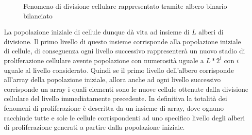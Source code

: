 \begin{figure}[H]
\centering
{}
\caption{Fenomeno di divisione cellulare rappresentato tramite albero
    binario bilanciato}
\label{fig:proliferation-tree}
\end{figure}

La popolazione iniziale di cellule dunque dà vita ad insieme di $L$ alberi di
divisione. Il primo livello di questo insieme corrisponde alla popolazione
iniziale di cellule, di conseguenza ogni livello successivo rappresenterà
un nuovo stadio di proliferazione cellulare avente popolazione con numerosità
uguale a $L * 2^{i}$ con $i$ uguale al livello considerato.
Quindi se il primo livello dell'albero corrisponde all'array della popolazione
iniziale, allora anche ad ogni livello successivo corrisponde un array i quali
elementi sono le nuove cellule ottenute dalla divisione cellulare del livello
immediatamente precedente.
In definitiva la totalità dei fenomeni di proliferazione è descritta da un
insieme di array, dove ognuno racchiude tutte e sole le cellule
corrispondenti ad uno specifico livello degli alberi di proliferazione generati
a partire dalla popolazione iniziale.
